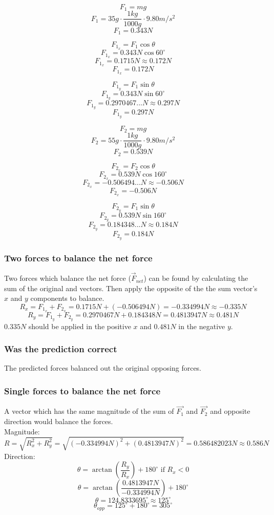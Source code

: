\documentclass[11pt, letterpaper, includehead]{article}
\begin{document}
\begin{multicols}{2}
  $$F_1 = mg$$
  $$F_1 = 35g \cdot \frac{1kg}{1000g} \cdot 9.80m/s^2$$
  $$F_1 = 0.343N$$

  $$F_{1_x} = F_1\cos\theta$$
  $$F_{1_x} = 0.343N\cos60^{\circ}$$
  $$F_{1_x} = 0.1715N \approx 0.172N$$
  $$\boxed{F_{1_x} = 0.172N}$$

  $$F_{1_y} = F_1\sin\theta$$
  $$F_{1_y} = 0.343N\sin60^{\circ}$$
  $$F_{1_y} = 0.2970467...N \approx 0.297N$$
  $$\boxed{F_{1_y} = 0.297N}$$

  \columnbreak
  $$F_2 = mg$$
  $$F_2 = 55g \cdot \frac{1kg}{1000g} \cdot 9.80m/s^2$$
  $$F_2 = 0.539N$$

  $$F_{2_x} = F_2\cos\theta$$
  $$F_{2_x} = 0.539N\cos160^{\circ}$$
  $$F_{2_x} = -0.506494...N \approx -0.506N$$
  $$\boxed{F_{2_x} = -0.506N}$$

  $$F_{2_y} = F_1\sin\theta$$
  $$F_{2_y} = 0.539N\sin160^{\circ}$$
  $$F_{2_y} = 0.184348...N \approx 0.184N$$
  $$\boxed{F_{2_y} = 0.184N}$$
\end{multicols}

\subsubsection{Two forces to balance the net force} %
Two forces which balance the net force ($\vec{F}_{net}$) can be found by calculating the sum of 
the original and vectors. Then apply the opposite of the the sum vector's $x$ and $y$ components to balance.
$$R_x = F_{1_x} + F_{2_x} = 0.1715N + (-0.506494N) = -0.334994N \approx \boxed{-0.335N}$$
$$R_y = F_{1_y} + F_{2_y} = 0.2970467N + 0.184348N = 0.4813947N \approx \boxed{0.481N}$$
$0.335N$ should be applied in the positive $x$ and $0.481N$ in the negative $y$.

\subsubsection{Was the prediction correct} %
The predicted forces balanced out the original opposing forces. 

\subsubsection{Single forces to balance the net force} %
A vector which has the same magnitude of the sum of $\vec{F_1}$ and $\vec{F_2}$ 
and opposite direction would balance the forces.\\
Magnitude:
$$R = \sqrt{R_x^2 + R_y^2} = \sqrt{(-0.334994N)^2 + (0.4813947N)^2} = 0.586482023N \approx \boxed{0.586N}$$
Direction:
$$\theta = \arctan \left( \frac{R_y}{R_x} \right) + 180^{\circ} \text{ if } R_x < 0$$
$$\theta = \arctan \left( \frac{0.4813947N}{-0.334994N} \right) + 180^{\circ}$$
$$\theta = 124.8333695^{\circ} \approx {125^{\circ}}$$
$$\theta_{opp} = 125^{\circ} + 180^{\circ} = \boxed{305^{\circ}}$$
\end{document}
